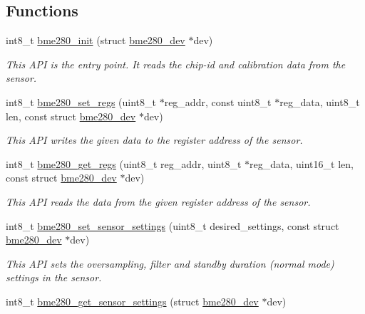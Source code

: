 \subsection*{Functions}
\begin{DoxyCompactItemize}
\item 
int8\+\_\+t \hyperlink{group___b_m_e280_gaf0b7d7a19bb48ec9eb3651b79f0c3e85}{bme280\+\_\+init} (struct \hyperlink{structbme280__dev}{bme280\+\_\+dev} $\ast$dev)
\begin{DoxyCompactList}\small\item\em This A\+PI is the entry point. It reads the chip-\/id and calibration data from the sensor. \end{DoxyCompactList}\item 
int8\+\_\+t \hyperlink{group___b_m_e280_ga002175df0ebe7893fcf0a54dfe806ba1}{bme280\+\_\+set\+\_\+regs} (uint8\+\_\+t $\ast$reg\+\_\+addr, const uint8\+\_\+t $\ast$reg\+\_\+data, uint8\+\_\+t len, const struct \hyperlink{structbme280__dev}{bme280\+\_\+dev} $\ast$dev)
\begin{DoxyCompactList}\small\item\em This A\+PI writes the given data to the register address of the sensor. \end{DoxyCompactList}\item 
int8\+\_\+t \hyperlink{group___b_m_e280_ga992c5a438b414fe4724764738b88d9d7}{bme280\+\_\+get\+\_\+regs} (uint8\+\_\+t reg\+\_\+addr, uint8\+\_\+t $\ast$reg\+\_\+data, uint16\+\_\+t len, const struct \hyperlink{structbme280__dev}{bme280\+\_\+dev} $\ast$dev)
\begin{DoxyCompactList}\small\item\em This A\+PI reads the data from the given register address of the sensor. \end{DoxyCompactList}\item 
int8\+\_\+t \hyperlink{group___b_m_e280_ga5d436d907394fde22471347599948205}{bme280\+\_\+set\+\_\+sensor\+\_\+settings} (uint8\+\_\+t desired\+\_\+settings, const struct \hyperlink{structbme280__dev}{bme280\+\_\+dev} $\ast$dev)
\begin{DoxyCompactList}\small\item\em This A\+PI sets the oversampling, filter and standby duration (normal mode) settings in the sensor. \end{DoxyCompactList}\item 
int8\+\_\+t \hyperlink{group___b_m_e280_gaf3bef90d33942197a98715ea8657211f}{bme280\+\_\+get\+\_\+sensor\+\_\+settings} (struct \hyperlink{structbme280__dev}{bme280\+\_\+dev} $\ast$dev)

\end{DoxyCompactItemize}
